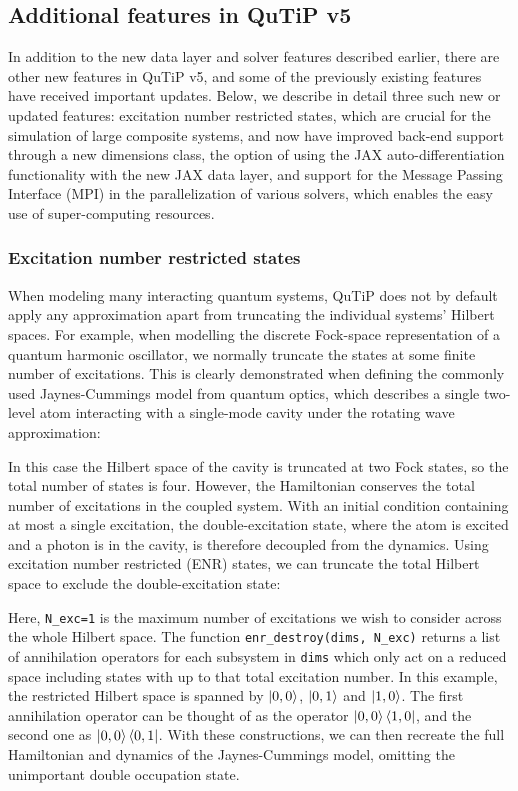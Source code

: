 \documentclass[preprint,3p,sort&compress]{elsarticle}
\def\code#1{\texttt{#1}}
\begin{document}
\subsection{Additional features in QuTiP v5}

In addition to the new data layer and solver features described earlier, there are other new features in QuTiP v5, and some of the previously existing features have received important updates. Below, we describe in detail three such new or updated features: excitation number restricted states, which are crucial for the simulation of large composite systems, and now have improved back-end support through a new dimensions class, the option of using the JAX auto-differentiation functionality with the new JAX data layer, and support for the Message Passing Interface (MPI) in the parallelization of various solvers, which enables the easy use of super-computing resources.



\subsubsection{Excitation number restricted states}\label{enr}

When modeling many interacting quantum systems, QuTiP does not by default apply any approximation
apart from truncating the individual systems' Hilbert spaces. For example, when modelling
the discrete Fock-space representation of a quantum harmonic oscillator, we normally truncate the states at some finite number of excitations. This is clearly demonstrated when defining the commonly used Jaynes-Cummings model from quantum optics, which describes a single two-level atom interacting with a single-mode cavity under the rotating wave approximation:


In this case the Hilbert space of the cavity is truncated at two Fock states, so the total number of states is four. However, the Hamiltonian conserves the total number of excitations in the coupled system. With an initial condition containing at most a single excitation, the double-excitation state, where the atom is excited and a photon is in the cavity, is therefore decoupled from the dynamics.  Using excitation number restricted (ENR) states, we can truncate the total Hilbert space to exclude the double-excitation state:


Here, \code{N\_exc=1} is the maximum number of excitations we wish to consider across the whole Hilbert space. The function \code{enr\_destroy(dims, N\_exc)} returns a list of annihilation operators for each subsystem in \code{dims} which only act on a reduced space including states with up to that total excitation number.  In this example, the restricted Hilbert space is spanned by $\ket{0,0}$, $\ket{0,1}$ and $\ket{1,0}$.  The first annihilation operator can be thought of as the operator $\ket{0,0}\bra{1,0}$, and the second one as $\ket{0,0}\bra{0,1}$.  With these constructions, we can then recreate the full Hamiltonian and dynamics of the Jaynes-Cummings model, omitting the unimportant double occupation state.
\end{document}
